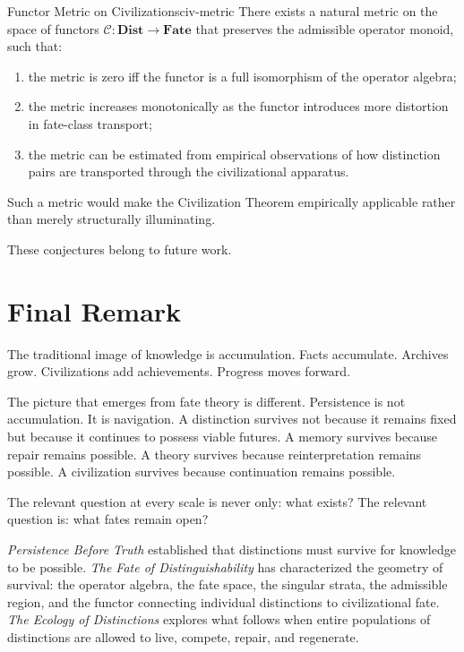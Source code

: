 \documentclass[12pt,twoside,openright]{book}
\newcommand{\catDist}{\mathbf{Dist}}
\newcommand{\catFate}{\mathbf{Fate}}
\newcommand{\civFunc}{\mathcal{C}}
\providecommand{\catDist}{\mathbf{Dist}}
\providecommand{\catFate}{\mathbf{Fate}}
\providecommand{\civFunc}{\mathcal{C}}
\begin{document}
\begin{conjecture}{Functor Metric on Civilizations}{civ-metric}
There exists a natural metric on the space of functors
$\civFunc:\catDist\to\catFate$ that preserves the admissible
operator monoid, such that:
\begin{enumerate}[nosep,label=(\roman*)]
  \item the metric is zero iff the functor is a full
    isomorphism of the operator algebra;
  \item the metric increases monotonically as the functor
    introduces more distortion in fate-class transport;
  \item the metric can be estimated from empirical observations
    of how distinction pairs are transported through the
    civilizational apparatus.
\end{enumerate}
Such a metric would make the Civilization Theorem empirically
applicable rather than merely structurally illuminating.
\end{conjecture}

These conjectures belong to future work.

\section{Final Remark}

The traditional image of knowledge is accumulation. Facts
accumulate. Archives grow. Civilizations add achievements.
Progress moves forward.

The picture that emerges from fate theory is different.
Persistence is not accumulation. It is navigation. A
distinction survives not because it remains fixed but because
it continues to possess viable futures. A memory survives
because repair remains possible. A theory survives because
reinterpretation remains possible. A civilization survives
because continuation remains possible.

The relevant question at every scale is never only: what
exists? The relevant question is: what fates remain open?

\textit{Persistence Before Truth} established that distinctions
must survive for knowledge to be possible.
\textit{The Fate of Distinguishability} has characterized the
geometry of survival: the operator algebra, the fate space, the
singular strata, the admissible region, and the functor
connecting individual distinctions to civilizational fate.
\textit{The Ecology of Distinctions} explores what follows when
entire populations of distinctions are allowed to live,
compete, repair, and regenerate.
\end{document}

